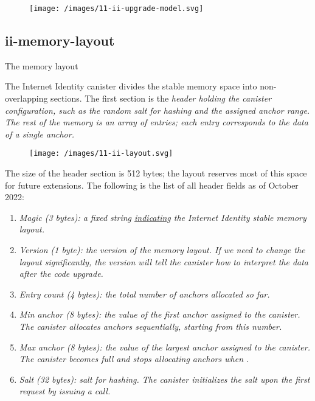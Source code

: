\documentclass{article}
\begin{document}
\begin{figure}[grayscale-diagram]
  \texttt{[image: /images/11-ii-upgrade-model.svg]}
\end{figure}

\subsection{ii-memory-layout}{The memory layout}

The Internet Identity canister divides the stable memory space into non-overlapping sections.
The first section is the \em{header} holding the canister configuration, such as the random salt for hashing and the assigned anchor range.
The rest of the memory is an array of \em{entries}; each entry corresponds to the data of a single anchor.

\begin{figure}[grayscale-diagram]
  \texttt{[image: /images/11-ii-layout.svg]}
\end{figure}

The size of the header section is 512 bytes; the layout reserves most of this space for future extensions.
The following is the list of all header fields as of October 2022:
\begin{enumerate}
  \item 
    \em{Magic} (3 bytes): a fixed string  \href{https://en.wikipedia.org/wiki/Magic_number_(programming)#Format_indicators}{indicating} the Internet Identity stable memory layout.
  \item 
    \em{Version} (1 byte): the version of the memory layout.
    If we need to change the layout significantly, the version will tell the canister how to interpret the data after the code upgrade.
  \item 
    \em{Entry count} (4 bytes): the total number of anchors allocated so far.
  \item 
    \em{Min anchor} (8 bytes): the value of the first anchor assigned to the canister.
    The canister allocates anchors sequentially, starting from this number.
  \item 
    \em{Max anchor} (8 bytes): the value of the largest anchor assigned to the canister.
    The canister becomes full and stops allocating anchors when .
  \item 
    \em{Salt} (32 bytes): salt for hashing.
    The canister initializes the salt upon the first request by issuing a \href{https://internetcomputer.org/docs/current/references/ic-interface-spec/#ic-raw_rand}{} call.
\end{enumerate}
\end{document}
